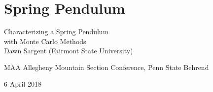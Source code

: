 \documentclass{beamer}
\date{}
\begin{document}
\section{Spring Pendulum}
\begin{frame}[noframenumbering]{ \hspace{1pt}}

\begin{center}
\huge Characterizing a Spring Pendulum \\ with Monte Carlo Methods \\
\vspace{12 pt}
\normalsize Dawn Sargent (Fairmont State University)

{\small MAA Allegheny Mountain Section Conference, Penn State Behrend

6 April 2018}
\end{center}
\end{frame}
\end{document}
